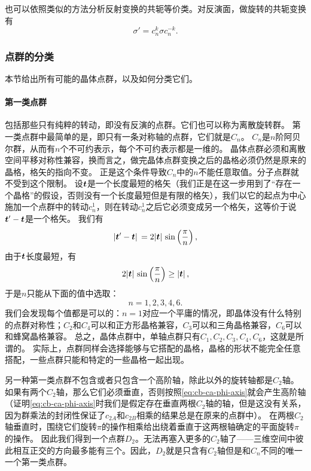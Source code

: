 也可以依照类似的方法分析反射变换的共轭等价类。对反演面，做旋转的共轭变换有
\begin{equation}
    \sigma' = c_n^k \sigma c_n^{-k}.
\end{equation}

\subsubsection{点群的分类}

本节给出所有可能的晶体点群，以及如何分类它们。

\paragraph{第一类点群} 包括那些只有纯粹的转动，即没有反演的点群。它们也可以称为离散旋转群。
第一类点群中最简单的是，即只有一条对称轴的点群，它们就是$C_n$。
$C_n$是$n$阶阿贝尔群，从而有$n$个不可约表示，每个不可约表示都是一维的。
晶体点群必须和离散空间平移对称性兼容，换而言之，做完晶体点群变换之后的晶格必须仍然是原来的晶格，格矢的指向不变。
正是这个条件导致$C_n$中的$n$不能任意取值。分子点群就不受到这个限制。
设$\vb*{t}$是一个长度最短的格矢（我们正是在这一步用到了“存在一个晶格”的假设，否则没有一个长度最短但是有限的格矢），我们以它的起点为中心施加一个点群中的转动$c_n^1$，则在转动$c_n^1$之后它必须变成另一个格矢，这等价于说$\vb*{t}' - \vb*{t}$是一个格矢。
我们有
\[
    \abs*{\vb*{t}' - \vb*{t}} = 2 \abs*{\vb*{t}} \sin\left(\frac{\pi}{n}\right),
\]
由于$\vb*{t}$长度最短，有
\[
    2 \abs*{\vb*{t}} \sin\left(\frac{\pi}{n}\right) \geq \abs*{\vb*{t}},
\]
于是$n$只能从下面的值中选取：
\[
    n = 1, 2, 3, 4, 6.
\]
我们会发现每个值都是可以的：$n=1$对应一个平庸的情况，即晶体没有什么特别的点群对称性；$C_2$和$C_4$可以和正方形晶格兼容，$C_3$可以和三角晶格兼容，$C_6$可以和蜂窝晶格兼容。
总之，晶体点群中，单轴点群只有$C_1, C_2, C_3, C_4, C_6$，这就是所谓的。
实际上，点群同样会选择能够与它搭配的晶格，晶格的形状不能完全任意搭配，一些点群只能和特定的一些晶格一起出现。

另一种第一类点群不包含或者只包含一个高阶轴，除此以外的旋转轴都是$C_2$轴。
如果有两个$C_2$轴，那么它们必须垂直，否则按照\eqref{eq:cb-ca-phi-axis}就会产生高阶轴（证明\eqref{eq:cb-ca-phi-axis}时我们是假定存在垂直两根$C_2$轴的轴，但是这没有关系，因为群乘法的封闭性保证了$c_{2A}$和$c_{2B}$相乘的结果总是在原来的点群中）。
在两根$C_2$轴垂直时，围绕它们旋转$\pi$的操作相乘给出绕着垂直于这两根轴确定的平面旋转$\pi$的操作。
因此我们得到一个点群$D_2$。无法再塞入更多的$C_2$轴了——三维空间中彼此相互正交的方向最多能有三个。因此，$D_2$就是只含有$C_2$轴但是和$C_n$不同的唯一一个第一类点群。

